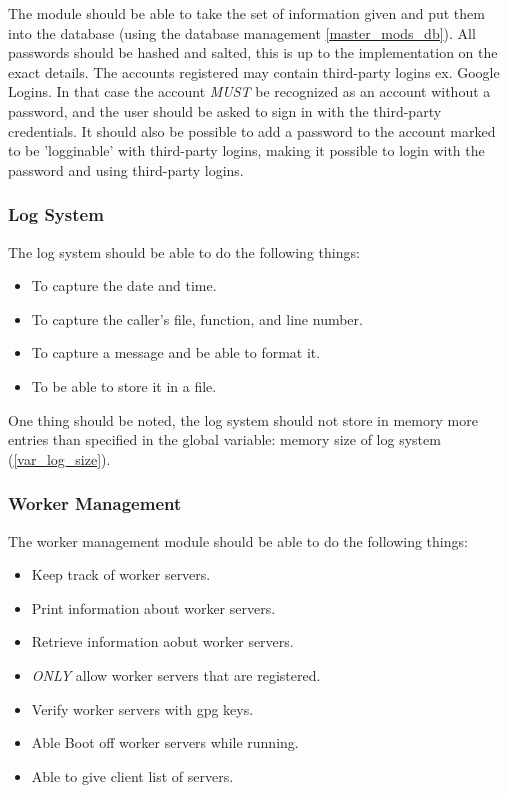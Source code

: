 \documentclass[a4paper]{article}
\begin{document}
The module should be able to take the set of information given and put them
into the database (using the database management \ref{master_mods_db}).
All passwords should be hashed and salted, this is up to the implementation on
the exact details. The accounts registered may contain third-party logins ex. 
Google Logins. In that case the account \emph{MUST} be recognized as an account
without a password, and the user should be asked to sign in with the 
third-party credentials. It should also be possible to add a password to the 
account marked to be 'logginable' with third-party logins, making it possible 
to login with the password and using third-party logins.

\subsubsection{Log System}
The log system should be able to do the following things:
\begin{itemize}
	\item To capture the date and time.
	\item To capture the caller's file, function, and line number.
	\item To capture a message and be able to format it.
	\item To be able to store it in a file.
\end{itemize}

One thing should be noted, the log system should not store in memory more 
entries than specified in the global variable: memory size of log system
(\ref{var_log_size}).

\subsubsection{Worker Management}
The worker management module should be able to do the following things:
\begin{itemize}
	\item Keep track of worker servers.
	\item Print information about worker servers.
	\item Retrieve information aobut worker servers.
	\item \emph{ONLY} allow worker servers that are registered.
	\item Verify worker servers with gpg keys.
	\item Able Boot off worker servers while running.
	\item Able to give client list of servers.
\end{itemize}
\end{document}
